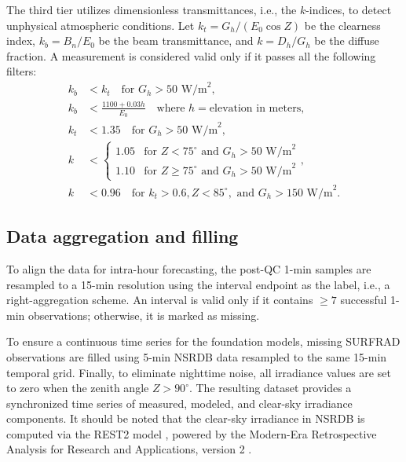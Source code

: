 \documentclass[number, 3p, 10pt, times]{elsarticle}
\begin{document}
The third tier utilizes dimensionless transmittances, i.e., the $k$-indices, to detect unphysical atmospheric conditions. Let $k_t = G_h / (E_0 \cos Z)$ be the clearness index, $k_b = B_n / E_0$ be the beam transmittance, and $k = D_h / G_h$ be the diffuse fraction. A measurement is considered valid only if it passes all the following filters:
\begin{align}
    k_b &< k_t \quad \text{for } G_h > 50\text{ W/m}^2, \\
    k_b &< \frac{1100 + 0.03h}{E_0} \quad \text{where } h = \text{elevation in meters}, \\
    k_t &< 1.35 \quad \text{for } G_h > 50\text{ W/m}^2, \\
    k &< 
    \begin{cases} 
    1.05 & \text{for } Z < 75^\circ \text{ and } G_h > 50\text{ W/m}^2\\
    1.10 & \text{for } Z \geq 75^\circ \text{ and } G_h > 50\text{ W/m}^2
    \end{cases}, \\
    k &< 0.96 \quad \text{for } k_t > 0.6, Z < 85^\circ, \text{ and } G_h > 150\text{ W/m}^2.
\end{align}

\subsection{Data aggregation and filling}
To align the data for intra-hour forecasting, the post-QC 1-min samples are resampled to a 15-min resolution using the interval endpoint as the label, i.e., a right-aggregation scheme. An interval is valid only if it contains $\geq 7$ successful 1-min observations; otherwise, it is marked as missing.

To ensure a continuous time series for the foundation models, missing SURFRAD observations are filled using 5-min NSRDB data \citep{Yang2021NSRDB} resampled to the same 15-min temporal grid. Finally, to eliminate nighttime noise, all irradiance values are set to zero when the zenith angle $Z > 90^\circ$. The resulting dataset provides a synchronized time series of measured, modeled, and clear-sky irradiance components. It should be noted that the clear-sky irradiance in NSRDB is computed via the REST2 model \citep{GUEYMARD2008272}, powered by the Modern-Era Retrospective Analysis for Research and Applications, version 2 \citep{Gelaro2017}.
\end{document}
